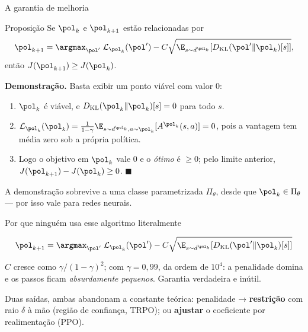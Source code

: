 \documentclass[aspectratio=169, 10pt]{beamer}
\newcommand{\thv}{\theta}
\newcommand{\polk}{\pol_{k}}
\newcommand{\polnovo}{\pol'}
\newcommand{\Dkl}{D_{\mathrm{KL}}}
\newcommand{\Lsub}[1]{\mathcal{L}_{#1}}
\begin{document}
\begin{frame}{A garantia de melhoria}

  \begin{teobox}{Proposição}
    Se $\polk$ e $\pol_{k+1}$ estão relacionadas por
    \[
      \pol_{k+1} = \argmax_{\polnovo}\;
        \Lsub{\polk}(\polnovo) - C\sqrt{\E_{s\sim d^{\polk}}[\Dkl(\polnovo\|\polk)[s]]},
    \]
    então $J(\pol_{k+1}) \ge J(\polk)$.
  \end{teobox}

  \textbf{Demonstração.} Basta exibir um ponto viável com valor $0$:
  \begin{enumerate}\setlength{\itemsep}{0ex}
    \item $\polk$ é viável, e $\Dkl(\polk\|\polk)[s] = 0$ para todo $s$.
    \item $\Lsub{\polk}(\polk) = \frac{1}{1-\gamma}\E_{s\sim d^{\polk},a\sim\polk}[A^{\polk}(s,a)] = 0$,
      pois a vantagem tem média zero sob a própria política.
    \item Logo o objetivo em $\polk$ vale $0$ e o \emph{ótimo} é $\ge 0$; pelo limite
      anterior, $J(\pol_{k+1}) - J(\polk) \ge 0$. \hfill$\blacksquare$
  \end{enumerate}

  \begin{ideiabox}
    A demonstração sobrevive a uma classe parametrizada $\Pi_{\thv}$, desde que
    $\polk \in \Pi_{\thv}$ --- por isso vale para redes neurais.
  \end{ideiabox}
\end{frame}

\begin{frame}{Por que ninguém usa esse algoritmo literalmente}

  \[
    \pol_{k+1} = \argmax_{\polnovo}\;
      \Lsub{\polk}(\polnovo) - C\sqrt{\E_{s\sim d^{\polk}}[\Dkl(\polnovo\|\polk)[s]]}
  \]

  \begin{alertabox}
    $C$ cresce como $\gamma/(1-\gamma)^2$; com $\gamma = 0{,}99$, da ordem de
    $10^4$: a penalidade domina e os passos ficam \emph{absurdamente pequenos}.
    Garantia verdadeira e inútil.
  \end{alertabox}

  \begin{ideiabox}
    Duas saídas, ambas abandonam a constante teórica: penalidade → \textbf{restrição}
    com raio $\delta$ à mão (região de confiança, TRPO); ou \textbf{ajustar} o
    coeficiente por realimentação (PPO).
  \end{ideiabox}
\end{frame}
\end{document}
